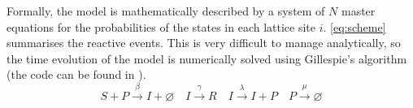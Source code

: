 \begin{table}[H]
    \centering
    \caption{Variables and parameters of the model}
    \label{tab:IBM_params}
\end{table}

Formally, the model is mathematically described by a system of $N$ master
equations for the probabilities of the states in each lattice site $i$.
\cref{eq:scheme} summarises the reactive events. This is
very difficult to manage analytically, so the time evolution of the model is
numerically solved using Gillespie's algorithm \cite{Gillespie1977} (the code
can be found in \cite{CODE}).
\begin{equation}\label{eq:scheme}
    S+P \stackrel{\beta}{\rightarrow} I + \varnothing \quad I
    \stackrel{\gamma}{\rightarrow} R \quad I \stackrel{\lambda}{\rightarrow}
    I+P
    \quad P \stackrel{\mu}{\rightarrow} \varnothing
\end{equation}

